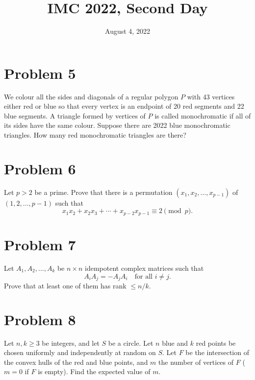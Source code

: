 \documentclass{article}
\title{IMC 2022, Second Day}
\date{August 4, 2022}
\begin{document}
\maketitle

\section*{Problem 5}
We colour all the sides and diagonals of a regular polygon $P$ with 43 vertices either red or blue so that every vertex is an endpoint of 20 red segments and 22 blue segments. A triangle formed by vertices of $P$ is called monochromatic if all of its sides have the same colour. Suppose there are 2022 blue monochromatic triangles. How many red monochromatic triangles are there?

\section*{Problem 6}
Let $p > 2$ be a prime. Prove that there is a permutation $(x_1, x_2, \ldots, x_{p-1})$ of $(1, 2, \ldots, p-1)$ such that
\[ x_1 x_2 + x_2 x_3 + \cdots + x_{p-2} x_{p-1} \equiv 2 \pmod{p}. \]

\section*{Problem 7}
Let $A_1, A_2, \ldots, A_k$ be $n \times n$ idempotent complex matrices such that
\[ A_i A_j = -A_j A_i \quad \text{for all } i \neq j. \]
Prove that at least one of them has rank $\leq n/k$.

\section*{Problem 8}
Let $n, k \geq 3$ be integers, and let $S$ be a circle. Let $n$ blue and $k$ red points be chosen uniformly and independently at random on $S$. Let $F$ be the intersection of the convex hulls of the red and blue points, and $m$ the number of vertices of $F$ ($m = 0$ if $F$ is empty). Find the expected value of $m$.
\end{document}
